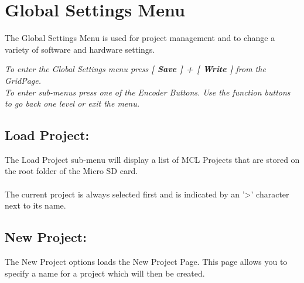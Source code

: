 \chapter{Global Settings Menu}
The Global Settings Menu is used for project management and to change a variety of software and hardware settings.


\textit{To enter the Global Settings menu press \textbf{[ Save ] + [ Write ]} from the GridPage.\\
To enter sub-menus press one of the Encoder Buttons. Use the function buttons to go back one level or exit the menu.}
\section{Load Project:}
The Load Project sub-menu will display a list of MCL Projects that are stored on the root folder of the Micro SD card.\\\\
The current project is always selected first and is indicated by an '>' character next to its name.
\section{New Project:}
The New Project options loads the New Project Page. This page allows you to specify a name for a project which will then be created.
